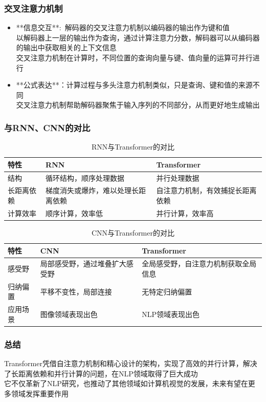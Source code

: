 \begin{frame}
    \frametitle{交叉注意力机制}
    \begin{itemize}
        \item **信息交互**:~解码器的交叉注意力机制以编码器的输出作为键和值\\
		以解码器上一层的输出作为查询，通过计算注意力分数，解码器可以从编码器的输出中获取相关的上下文信息\\
		交叉注意力机制在计算时，不同位置的查询向量与键、值向量的运算可并行进行
        \item **公式表达**：计算过程与多头注意力机制类似，只是查询、键和值的来源不同\\
		交叉注意力机制帮助解码器聚焦于输入序列的不同部分，从而更好地生成输出
    \end{itemize}
\end{frame}

\begin{frame}
	\frametitle{与\textrm{RNN}、\textrm{CNN}的对比}
    \begin{table}[ht]
        \centering
        \begin{tabular}{|l|l|l|}
            \hline
	    特性 & \textrm{RNN} & \textrm{Transformer} \\
            \hline
            结构 & 循环结构，顺序处理数据 & 并行处理数据 \\
            \hline
            长距离依赖 & 梯度消失或爆炸，难以处理长距离依赖 & 自注意力机制，有效捕捉长距离依赖 \\
            \hline
            计算效率 & 顺序计算，效率低 & 并行计算，效率高 \\
            \hline
        \end{tabular}
	\caption{\textrm{RNN}与\textrm{Transformer}的对比}
    \end{table}
    \begin{table}[ht]
        \centering
        \begin{tabular}{|l|l|l|}
            \hline
	    特性 & \textrm{CNN} & \textrm{Transformer} \\
            \hline
            感受野 & 局部感受野，通过堆叠扩大感受野 & 全局感受野，自注意力机制获取全局信息 \\
            \hline
            归纳偏置 & 平移不变性，局部连接 & 无特定归纳偏置 \\
            \hline
            应用场景 & 图像领域表现出色 & NLP领域表现出色 \\
            \hline
        \end{tabular}
	\caption{\textrm{CNN}与\textrm{Transformer}的对比}
    \end{table}
\end{frame}

\begin{frame}
    \frametitle{总结}
    \textrm{Transformer}凭借自注意力机制和精心设计的架构，实现了高效的并行计算，解决了长距离依赖和并行计算的问题，在\textrm{NLP}领域取得了巨大成功\\

    它不仅革新了\textrm{NLP}研究，也推动了其他领域如计算机视觉的发展，未来有望在更多领域发挥重要作用
\end{frame}
